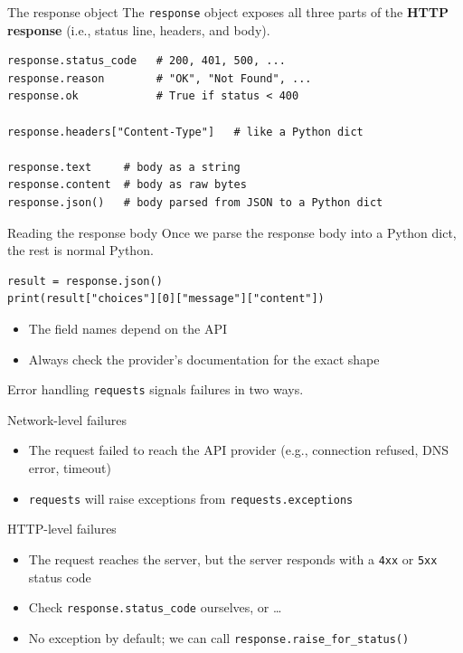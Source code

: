 \documentclass[aspectratio=169]{beamer}
\begin{document}
\begin{frame}[fragile]{The response object}
  The \texttt{response} object exposes all three parts of the \textbf{HTTP response} (i.e., status line, headers, and body).

    \begin{verbatim}
response.status_code   # 200, 401, 500, ...
response.reason        # "OK", "Not Found", ...
response.ok            # True if status < 400

response.headers["Content-Type"]   # like a Python dict

response.text     # body as a string
response.content  # body as raw bytes
response.json()   # body parsed from JSON to a Python dict
    \end{verbatim}
\note{
}
\end{frame}


\begin{frame}[fragile]{Reading the response body}
    Once we parse the response body into a Python dict, the rest is normal Python.
    \begin{verbatim}
result = response.json()
print(result["choices"][0]["message"]["content"])
    \end{verbatim}

    \vspace{0.5em}
    \begin{itemize}
        \item The field names depend on the API
        \item Always check the provider's documentation for the exact shape
    \end{itemize}
\note{
}
\end{frame}


\begin{frame}{Error handling}
    \texttt{requests} signals failures in two ways.

    \begin{block}{Network-level failures}
        \begin{itemize}
          \item The request failed to reach the API provider (e.g., connection refused, DNS error, timeout)
          \item \texttt{requests} will raise exceptions from \texttt{requests.exceptions}
        \end{itemize}
    \end{block}

    \begin{block}{HTTP-level failures}
        \begin{itemize}
          \item The request reaches the server, but the server responds with a \texttt{4xx} or \texttt{5xx} status code
          \item Check \texttt{response.status\_code} ourselves, or \dots
          \item No exception by default; we can call \texttt{response.raise\_for\_status()}
        \end{itemize}
    \end{block}
\note{
}
\end{frame}
\end{document}
